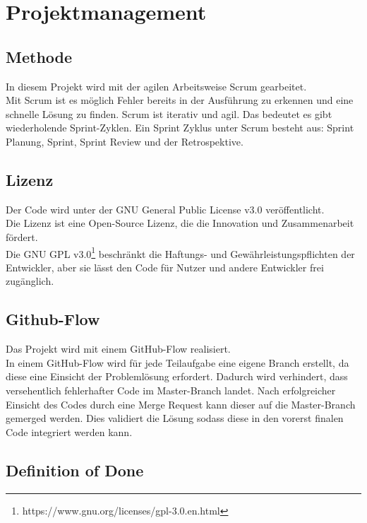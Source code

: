 \chapter{Projektmanagement}\label{ch:projektmanagement}

\section{Methode}\label{sec:methode}

In diesem Projekt wird mit der agilen Arbeitsweise Scrum gearbeitet.\\
Mit Scrum ist es möglich Fehler bereits in der Ausführung zu erkennen und eine schnelle Lösung zu finden.
Scrum ist iterativ und agil. Das bedeutet es gibt wiederholende Sprint-Zyklen.
Ein Sprint Zyklus unter Scrum besteht aus: Sprint Planung, Sprint, Sprint Review und der Retrospektive.

\section{Lizenz}\label{sec:lizenz}

Der Code wird unter der GNU General Public License v3.0 veröffentlicht.\\
Die Lizenz ist eine Open-Source Lizenz, die die Innovation und Zusammenarbeit fördert.\\
Die GNU GPL v3.0\footnote{https://www.gnu.org/licenses/gpl-3.0.en.html} beschränkt die Haftungs- und Gewährleistungspflichten der Entwickler, aber sie lässt den Code für Nutzer und andere Entwickler frei zugänglich.

\section{Github-Flow}\label{sec:github-flow}

Das Projekt wird mit einem GitHub-Flow realisiert.\\
In einem GitHub-Flow wird für jede Teilaufgabe eine eigene Branch erstellt, da diese eine Einsicht der Problemlösung erfordert.
Dadurch wird verhindert, dass versehentlich fehlerhafter Code im Master-Branch landet.
Nach erfolgreicher Einsicht des Codes durch eine Merge Request kann dieser auf die Master-Branch gemerged werden. Dies validiert die Lösung sodass diese in den vorerst finalen Code integriert werden kann.

\section{Definition of Done}\label{sec:dod}

